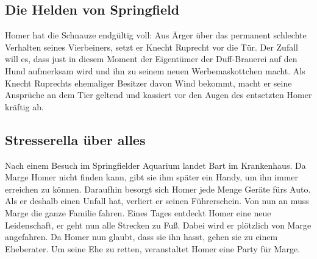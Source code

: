 \subsection{Die Helden von Springfield}
Homer hat die Schnauze endgültig voll: Aus Ärger über das permanent schlechte Verhalten seines Vierbeiners, setzt er Knecht Ruprecht vor die Tür. Der Zufall will es, dass just in diesem Moment der Eigentümer der Duff-Brauerei auf den Hund aufmerksam wird und ihn zu seinem neuen Werbemaskottchen macht. Als Knecht Ruprechts ehemaliger Besitzer davon Wind bekommt, macht er seine Ansprüche an dem Tier geltend und kassiert vor den Augen des entsetzten Homer kräftig ab.



\subsection{Stresserella über alles}
Nach einem Besuch im Springfielder Aquarium landet Bart im Krankenhaus. Da Marge Homer nicht finden kann, gibt sie ihm später ein Handy, um ihn immer erreichen zu können. Daraufhin besorgt sich Homer jede Menge Geräte fürs Auto. Als er deshalb einen Unfall hat, verliert er seinen Führerschein. Von nun an muss Marge die ganze Familie fahren. Eines Tages entdeckt Homer eine neue Leidenschaft, er geht nun alle Strecken zu Fuß. Dabei wird er plötzlich von Marge angefahren. Da Homer nun glaubt, dass sie ihn hasst, gehen sie zu einem Eheberater. Um seine Ehe zu retten, veranstaltet Homer eine Party für Marge.



